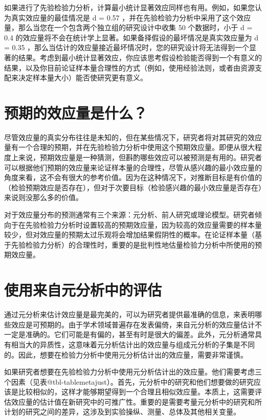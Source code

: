\documentclass[
  letterpaper,
  DIV=11,
  numbers=noendperiod]{scrreprt}
\begin{document}
如果进行了先验检验力分析，计算最小统计显著效应同样也有用。例如，如果您认为真实效应量的最佳情况是
d = 0.57
，并在先验检验力分析中采用了这个效应量，那么当您在一个包含两个独立组的研究设计中收集
50 个数据时，小于 d = 0.4
的效应量将不会在统计学上显著。如果备择假设的最坏情况是真实效应量为 d =
0.35
，那么当估计的效应量接近最坏情况时，您的研究设计将无法得到一个显著的结果。考虑到最小统计显著效应，你应该思考假设检验能否得到一个有意义的结果，以及你目前论证样本量合理性的方式（例如，使用经验法则，或者由资源支配来决定样本量大小）能否使研究更有意义。

\hypertarget{ux9884ux671fux7684ux6548ux5e94ux91cfux662fux4ec0ux4e48}{%
\section{预期的效应量是什么？}\label{ux9884ux671fux7684ux6548ux5e94ux91cfux662fux4ec0ux4e48}}

尽管效应量的真实分布往往是未知的，但在某些情况下，研究者将对其研究的效应量有一个合理的预期，并在先验检验力分析中使用这个预期效应量。即便从很大程度上来说，预期效应量是一种猜测，但斟酌哪些效应可以被预测是有用的。研究者可以根据他们预期的效应量来论证样本量的合理性，尽管从感兴趣的最小效应量的角度来看，这不会有很大的参考价值。因为在这种情况下，对推断目标是有价值的（检验预期效应是否存在），但对于次要目标（检验感兴趣的最小效应量是否存在）来说则没那么多的价值。

对于效应量分布的预测通常有三个来源：元分析、前人研究或理论模型。研究者倾向于在先验检验力分析时设置较高的预期效应量，因为较高的效应量需要的样本量较少，但对效应量的预期太过乐观将会增加结果假阴性的概率。在论证样本量（基于先验检验力分析）的合理性时，重要的是批判性地估量检验力分析中所使用的预期效应量。

\hypertarget{ux4f7fux7528ux6765ux81eaux5143ux5206ux6790ux4e2dux7684ux8bc4ux4f30}{%
\section{使用来自元分析中的评估}\label{ux4f7fux7528ux6765ux81eaux5143ux5206ux6790ux4e2dux7684ux8bc4ux4f30}}

通过元分析来估计效应量是最完美的，可以为研究者提供最准确的信息，来表明哪些效应是可预期的。由于学术领域普遍存在发表偏倚，来自元分析的效应量估计不一定是准确的。它们可能是有偏的，甚至有时是很大的偏差。此外，元分析通常具有相当大的异质性，这意味着元分析估计出的效应量与组成元分析的子集是不同的。因此，想要在检验力分析中使用元分析估计出的效应量，需要非常谨慎。

如果研究者想要在先验检验力分析中使用元分析估计出的效应量。他们需要考虑三个因素（见表@tbl-tablemetajust）。首先，元分析中的研究和他们想要做的研究应该是比较相似的，这样才能够期望得到一个合理且相似效应量。本质上，这需要评估效应量的估计值在新研究中的可推广性。重要的是需要考量元分析中的研究和所计划的研究之间的差异，这涉及到实验操纵、测量、总体及其他相关变量。
\end{document}
